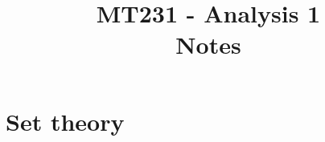 \documentclass[12pt]{article} %
\title{
    \vspace{2in}
        \textmd{\textbf{MT231 - Analysis 1}}\\
    \vspace{1in}
    \textmd{\textbf{Notes}}\\
    \vspace{1in}
}
\author{
    \mname
}
\date{}
\begin{document}
\maketitle

\pagebreak

\tableofcontents

\pagebreak

\section{Set theory }

\end{document}
